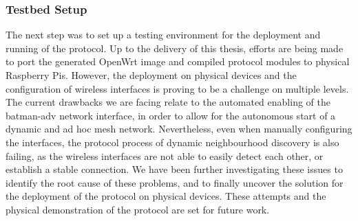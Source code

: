 \subsubsection{Testbed Setup} \label{sec:infrastructure:testbed}


The next step was to set up a testing environment for the deployment and running of the \pol{} protocol. Up to the delivery of this thesis, efforts are being made to port the generated OpenWrt image and compiled protocol modules to physical Raspberry Pis. However, the deployment on physical devices and the configuration of wireless interfaces is proving to be a challenge on multiple levels. The current drawbacks we are facing relate to the automated enabling of the batman-adv network interface, in order to allow for the autonomous start of a dynamic and ad hoc mesh network. Nevertheless, even when manually configuring the interfaces, the protocol process of dynamic neighbourhood discovery is also failing, as the wireless interfaces are not able to easily detect each other, or establish a stable connection. We have been further investigating these issues to identify the root cause of these problems, and to finally uncover the solution for the deployment of the protocol on physical devices. These attempts and the physical demonstration of the \pol{} protocol are set for future work.

